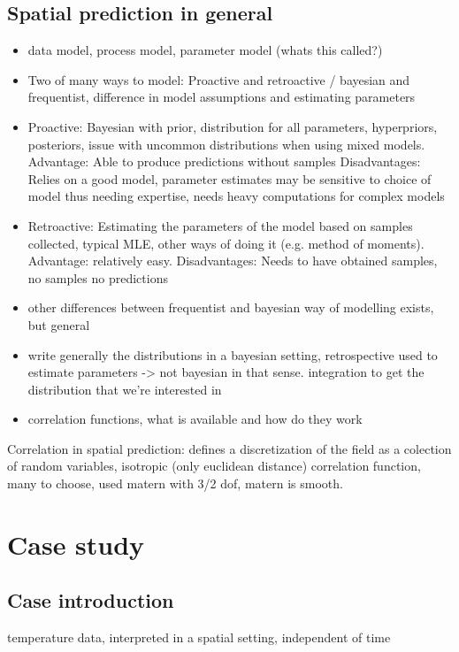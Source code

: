 \documentclass{report}
\begin{document}
\subsection{Spatial prediction in general}
\begin{itemize}
\item data model, process model,  parameter model (whats this called?)
\item Two of many ways to model: Proactive and retroactive / bayesian and frequentist, difference in model assumptions and estimating parameters 

\item Proactive: Bayesian with prior, distribution for all parameters, hyperpriors, posteriors, issue with uncommon distributions when using mixed models. Advantage: Able to produce predictions without samples Disadvantages: Relies on a good model, parameter estimates may be sensitive to choice of model thus needing expertise, needs heavy computations for complex models

\item Retroactive: Estimating the parameters of the model based on samples collected, typical MLE, other ways of doing it (e.g. method of moments). Advantage: relatively easy. Disadvantages: Needs to have obtained samples, no samples no predictions

\item other differences between frequentist and bayesian way of modelling exists, but general

\item write generally the distributions in a bayesian setting, retrospective used to estimate parameters -> not bayesian in that sense. integration to get the distribution that we're interested in

\item correlation functions, what is available and how do they work
\end{itemize}
Correlation in spatial prediction:
defines a discretization of the field as a colection of random variables, isotropic (only euclidean distance) correlation function, many to choose, used matern with 3/2 dof, matern is smooth. 

\section{Case study}
\subsection{Case introduction}
temperature data, interpreted in a spatial setting, independent of time
\end{document}

